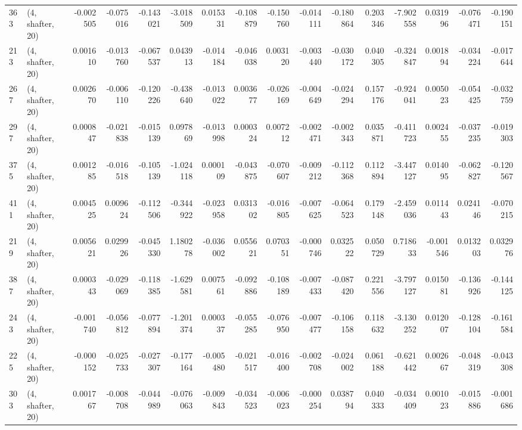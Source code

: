 \begin{tabular}{llrrrrrrrrrrrrrr}
363 &  (4, shafter, 20) &  -0.002505 & -0.075016 & -0.143021 &    -3.018509 &   0.015331 &  -0.108879 &  -0.150760 & -0.014111 & -0.180864 &  0.203346 &   -7.902558 &  0.031996 & -0.076471 & -0.190151 \\
213 &  (4, shafter, 20) &   0.001610 & -0.013760 & -0.067537 &     0.043913 &  -0.014184 &  -0.046038 &   0.003120 & -0.003440 & -0.030172 &  0.040305 &   -0.324847 &  0.001894 & -0.034224 & -0.017644 \\
267 &  (4, shafter, 20) &   0.002670 & -0.006110 & -0.120226 &    -0.438640 &  -0.013022 &   0.003677 &  -0.026169 & -0.004649 & -0.024294 &  0.157176 &   -0.924041 &  0.005023 & -0.054425 & -0.032759 \\
297 &  (4, shafter, 20) &   0.000847 & -0.021838 & -0.015139 &     0.097869 &  -0.013998 &   0.000324 &   0.007212 & -0.002471 & -0.002343 &  0.035871 &   -0.411723 &  0.002455 & -0.037235 & -0.019303 \\
375 &  (4, shafter, 20) &   0.001285 & -0.016518 & -0.105139 &    -1.024118 &   0.000109 &  -0.043875 &  -0.070607 & -0.009212 & -0.112368 &  0.112894 &   -3.447127 &  0.014095 & -0.062827 & -0.120567 \\
411 &  (4, shafter, 20) &   0.004525 &  0.009624 & -0.112506 &    -0.344922 &  -0.023958 &   0.031302 &  -0.016805 & -0.007625 & -0.064523 &  0.179148 &   -2.459036 &  0.011443 &  0.024146 & -0.070215 \\
219 &  (4, shafter, 20) &   0.005621 &  0.029926 & -0.045330 &     1.180278 &  -0.036002 &   0.055621 &   0.070351 & -0.000746 &  0.032522 &  0.050729 &    0.718633 & -0.001546 &  0.013203 &  0.032976 \\
387 &  (4, shafter, 20) &   0.000343 & -0.029069 & -0.118385 &    -1.629581 &   0.007561 &  -0.092886 &  -0.108189 & -0.007433 & -0.087420 &  0.221556 &   -3.797127 &  0.015081 & -0.136926 & -0.144125 \\
243 &  (4, shafter, 20) &  -0.001740 & -0.056812 & -0.077894 &    -1.201374 &   0.000337 &  -0.055285 &  -0.076950 & -0.007477 & -0.106158 &  0.118632 &   -3.130252 &  0.012007 & -0.128104 & -0.161584 \\
225 &  (4, shafter, 20) &  -0.000152 & -0.025733 & -0.027307 &    -0.177164 &  -0.005480 &  -0.021517 &  -0.016400 & -0.002708 & -0.024002 &  0.061188 &   -0.621442 &  0.002667 & -0.048319 & -0.043308 \\
303 &  (4, shafter, 20) &   0.001767 & -0.008708 & -0.044989 &    -0.076063 &  -0.009843 &  -0.034523 &  -0.006023 & -0.000254 &  0.038794 &  0.040333 &   -0.034409 &  0.001023 & -0.015886 & -0.001686 \\

\end{tabular}
